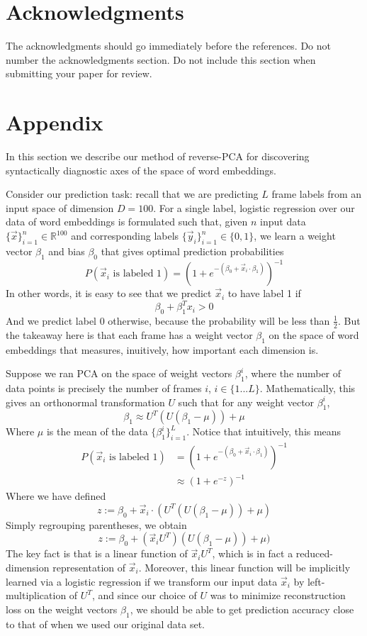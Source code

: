 \documentclass[11pt,a4paper]{article}
\begin{document}
\section*{Acknowledgments}

The acknowledgments should go immediately before the references.  Do
not number the acknowledgments section. Do not include this section
when submitting your paper for review.

%
%



\appendix

\section{Appendix}
\label{sec:supplemental}
In this section we describe our method of reverse-PCA for discovering syntactically diagnostic axes of the space of word embeddings.

Consider our prediction task: recall that we are predicting $L$ frame labels from an input space of dimension $D=100$. For a single label, logistic regression over our data of word embeddings is formulated such that, given $n$ input data $\{\vec x\}_{i=1}^n \in \mathbb{R}^{100}$ and corresponding labels $\{\vec y_i\}_{i=1}^n \in \{0,1\}$, we learn a weight vector $\beta_1$ and bias $\beta_0$ that gives optimal prediction probabilities
\[ P(\vec x_i \text{ is labeled } 1) = (1 + e^{-(\beta_0 + \vec x_i \cdot \beta_1)})^{-1} \]
In other words, it is easy to see that we predict $\vec x_i$ to have label 1 if 
\[  \beta_0 + \beta_1^T x_i > 0 \]
And we predict label 0 otherwise, because the probability will be less than $\frac{1}{2}$. But the takeaway here is that each frame has a weight vector $\beta_1$ on the space of word embeddings that measures, inuitively, how important each dimension is.  

Suppose we ran PCA on the space of weight vectors $\beta_1^i$, where the number of data points is precisely the number of frames $i$, $i \in \{1...L\}$. Mathematically, this gives an orthonormal transformation $U$ such that for any weight vector $\beta_1^i$, 
\[ \beta_1 \approx U^T(U(\beta_1 - \mu)) + \mu \] 
Where $\mu$ is the mean of the data $\{\beta_1^i\}_{i=1}^L$. Notice that intuitively, this means
\begin{align*} 
P(\vec x_i \text{ is labeled } 1) &= (1 + e^{-(\beta_0 + \vec x_i \cdot \beta_1)})^{-1}  \\
&\approx (1 + e^{-z})^{-1} 
\end{align*}
Where we have defined
\[ z := \beta_0 + \vec x_i \cdot (U^T(U(\beta_1 - \mu)) + \mu) \]
Simply regrouping parentheses, we obtain
\[ z := \beta_0 + (\vec x_i  U^T)(U(\beta_1 - \mu)) + \mu) \]
The key fact is that is a linear function of $\vec x_i U^T$, which is in fact a reduced-dimension representation of $\vec x_i$. Moreover, this linear function will be implicitly learned via a logistic regression if we transform our input data $\vec x_i$ by left-multiplication of $U^T$, and since our choice of $U$ was to minimize reconstruction loss on the weight vectors $\beta_1$, we should be able to get prediction accuracy close to that of when we used our original data set. 
\end{document}
